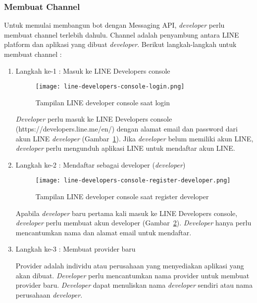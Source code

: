\subsubsection{Membuat Channel}
Untuk memulai membangun bot dengan Messaging API, \textit{developer} perlu membuat channel terlebih dahulu. Channel adalah penyambung antara LINE platform dan aplikasi yang dibuat \textit{developer}. Berikut langkah-langkah untuk membuat channel :
\begin{enumerate}
\item Langkah ke-1 : Masuk ke LINE Developers console

\begin{figure}[H]
	\centering  
	\texttt{[image: line-developers-console-login.png]}  
	\caption[Tampilan LINE developer console saat login]{Tampilan LINE developer console saat login} 
	\label{fig:line-developers-console-login} 
\end{figure}

\textit{Developer} perlu masuk ke LINE Developers console (https://developers.line.me/en/) dengan alamat email dan password dari akun LINE \textit{developer} (Gambar~\ref{fig:line-developers-console-login}). Jika \textit{developer} belum memiliki akun LINE, \textit{developer} perlu mengunduh aplikasi LINE untuk mendaftar akun LINE.

\item Langkah ke-2 : Mendaftar sebagai developer (\textit{developer})

\begin{figure}[H]
	\centering  
	\texttt{[image: line-developers-console-register-developer.png]}  
	\caption[Tampilan LINE developer console saat register developer]{Tampilan LINE developer console saat register developer} 
	\label{fig:line-developers-console-register-developer} 
\end{figure}

Apabila \textit{developer} baru pertama kali masuk ke LINE Developers console, \textit{developer} perlu membuat akun developer (Gambar~\ref{fig:line-developers-console-register-developer}). \textit{Developer} hanya perlu mencantumkan nama dan alamat email untuk mendaftar.

\item Langkah ke-3 : Membuat provider baru

Provider adalah individu atau perusahaan yang menyediakan aplikasi yang akan dibuat. \textit{Developer} perlu mencantumkan nama provider untuk membuat provider baru. \textit{Developer} dapat menuliskan nama \textit{developer} sendiri atau nama perusahaan \textit{developer}.


\end{enumerate}

